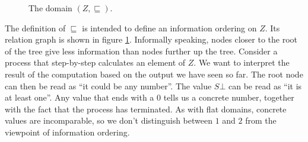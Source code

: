 \documentclass[a4paper]{article}
\begin{document}
\begin{figure}
\begin{center}
\end{center}
\caption{The domain $(Z, \sqsubseteq)$.}
\label{figDomainOfNuF}
\end{figure}

The definition of $\sqsubseteq$ is intended to define an information ordering on
$Z$.  Its relation graph is shown in figure \ref{figDomainOfNuF}.
Informally speaking, nodes closer to the root of the tree give less information
than nodes further up the tree.  Consider a process that step-by-step calculates
an element of $Z$.  We want to interpret the result of the computation
based on the output we have seen so far.  The root node can then be read as ``it
could be any number''.  The value $S\bot$ can be read as ``it is at least one''.
Any value that ends with a $0$ tells us a concrete number, together with the
fact that the process has terminated.  As with flat domains, concrete values are
incomparable, so we don't distinguish between $1$ and $2$ from the viewpoint of
information ordering.
\end{document}
